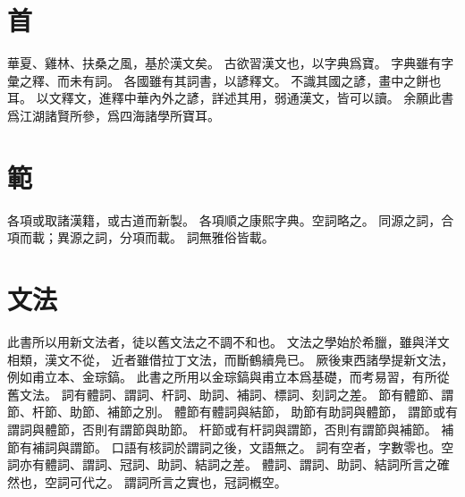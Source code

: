 \section{首}
華夏、雞林、扶桑之風，基於漢文矣。
古欲習漢文也，以字典爲寶。
字典雖有字彙之釋、而未有詞。
各國雖有其詞書，以諺釋文。
不識其國之諺，畫中之餅也耳。
以文釋文，進釋中華內外之諺，詳述其用，弱通漢文，皆可以讀。
余願此書爲江湖諸賢所參，爲四海諸學所寶耳。
\section{範}
各項或取諸漢籍，或古道而新製。
各項順之康熙字典。空詞略之。
同源之詞，合項而載；異源之詞，分項而載。
詞無雅俗皆載。
\section{文法}
此書所以用新文法者，徒以舊文法之不調不和也。
文法之學始於希臘，雖與洋文相類，漢文不從，
近者雖借拉丁文法，而斷鶴續鳧已。
厥後東西諸學提新文法，例如甫立本、金琮鎬。
此書之所用以金琮鎬與甫立本爲基礎，而考易習，有所從舊文法。
詞有體詞、謂詞、杆詞、助詞、補詞、標詞、刻詞之差。
節有體節、謂節、杆節、助節、補節之別。
體節有體詞與結節，
助節有助詞與體節，
謂節或有謂詞與體節，否則有謂節與助節。
杆節或有杆詞與謂節，否則有謂節與補節。
補節有補詞與謂節。
口語有核詞於謂詞之後，文語無之。
詞有空者，字數零也。空詞亦有體詞、謂詞、冠詞、助詞、結詞之差。
體詞、謂詞、助詞、結詞所言之確然也，空詞可代之。
謂詞所言之實也，冠詞槪空。
